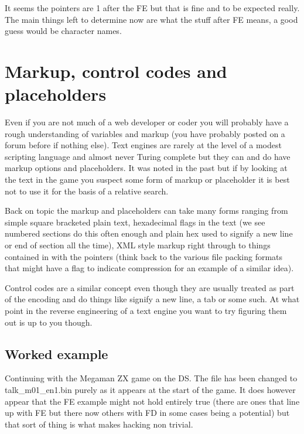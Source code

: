 \documentclass[
]{book}
\begin{document}
It seems the pointers are 1 after the FE but that is fine and to be expected really. The main things left to determine now are what the stuff after FE means, a good guess would be character names.

\hypertarget{markup-control-codes-and-placeholders}{%
\section{Markup, control codes and placeholders}\label{markup-control-codes-and-placeholders}}

Even if you are not much of a web developer or coder you will probably have a rough understanding of variables and markup (you have probably posted on a forum before if nothing else). Text engines are rarely at the level of a modest scripting language and almost never Turing complete but they can and do have markup options and placeholders. It was noted in the past but if by looking at the text in the game you suspect some form of markup or placeholder it is best not to use it for the basis of a relative search.

Back on topic the markup and placeholders can take many forms ranging from simple square bracketed plain text, hexadecimal flags in the text (we see numbered sections do this often enough and plain hex used to signify a new line or end of section all the time), XML style markup right through to things contained in with the pointers (think back to the various file packing formats that might have a flag to indicate compression for an example of a similar idea).

Control codes are a similar concept even though they are usually treated as part of the encoding and do things like signify a new line, a tab or some such. At what point in the reverse engineering of a text engine you want to try figuring them out is up to you though.

\hypertarget{worked-example}{%
\subsection{Worked example}\label{worked-example}}

Continuing with the Megaman ZX game on the DS. The file has been changed to talk\_m01\_en1.bin purely as it appears at the start of the game. It does however appear that the FE example might not hold entirely true (there are ones that line up with FE but there now others with FD in some cases being a potential) but that sort of thing is what makes hacking non trivial.
\end{document}
